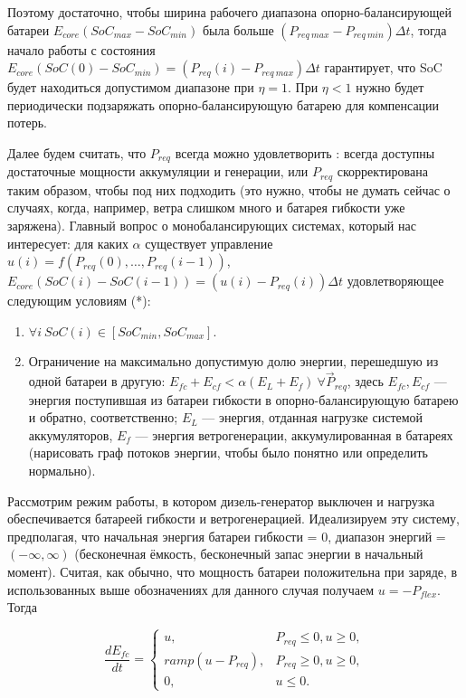 \documentclass{report}
\begin{document}
Поэтому достаточно, чтобы ширина рабочего диапазона опорно-балансирующей батареи $E_{core}(SoC_{max} - SoC_{min})$ была больше $\left(P_{req~max} - P_{req~min}\right)\Delta t$, тогда начало работы с состояния 
$E_{core}(SoC(0) - SoC_{min}) = \left(P_{req}(i) - P_{req~max}\right)\Delta t $ гарантирует, что SoC будет находиться допустимом диапазоне при $\eta = 1$.
При $\eta < 1$ нужно будет периодически подзаряжать опорно-балансирующую батарею для компенсации потерь.

Далее будем считать, что $P_{req}$ всегда можно удовлетворить : всегда доступны достаточные мощности аккумуляции и генерации, или  $P_{req}$ скорректирована таким образом, чтобы под них подходить (это нужно, чтобы не думать сейчас о случаях, когда, например, ветра слишком много и батарея гибкости уже заряжена).  
Главный вопрос о монобалансирующих системах, который нас интересует: для каких $\alpha$ существует управление $u(i) = f(P_{req}(0), \ldots, P_{req}(i-1))$, $E_{core}(SoC(i) - SoC(i-1)) = \left( u(i) - P_{req}(i)\right)\Delta t$ удовлетворяющее следующим условиям (*):
\begin{enumerate}
    \item $\forall i ~ SoC(i) \in [SoC_{min}, SoC_{max}]$.
    \item Ограничение на максимально допустимую долю энергии, перешедшую из одной батареи в другую: $E_{fc} + E_{cf} < \alpha (E_{L} + E_f) ~\forall \Vec{P}_{req}$, здесь $E_{fc}, E_{cf}$ --- энергия поступившая из батареи гибкости в опорно-балансирующую батарею и обратно, соответственно; 
    $E_{L}$ ---  энергия, отданная нагрузке системой аккумуляторов, $E_{f}$ --- энергия ветрогенерации, аккумулированная в батареях (нарисовать граф потоков энергии, чтобы было понятно или определить нормально).
\end{enumerate}

Рассмотрим режим работы, в котором дизель-генератор выключен и нагрузка обеспечивается батареей гибкости и ветрогенерацией.
Идеализируем эту систему, предполагая, что начальная энергия батареи гибкости = 0, диапазон энергий = $(-\infty, \infty)$ (бесконечная ёмкость, бесконечный запас энергии в начальный момент).
Считая, как обычно, что мощность батареи положительна при заряде, в использованных выше обозначениях для данного случая получаем $u = -P_{flex}$.
Тогда 

\begin{equation}
\label{f:Efc}
\frac{dE_{fc}}{dt} = 
\begin{cases}
u,& P_{req} \leq 0, u \geq 0,\\
ramp(u - P_{req}),& P_{req} \geq 0, u \geq 0,\\
0,& u \leq 0.
\end{cases}
\end{equation}
\end{document}
